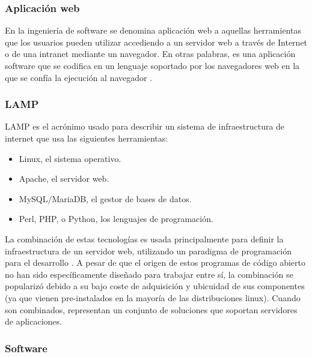 \subsubsection{Aplicación web}
En la ingeniería de software se denomina aplicación web a aquellas herramientas que los usuarios pueden utilizar accediendo a un servidor web a través de Internet o de una intranet mediante un navegador. En otras palabras, es una aplicación software que se codifica en un lenguaje soportado por los navegadores web en la que se confía la ejecución al navegador \citep{mora}.

\subsubsection{LAMP}

LAMP es el acrónimo usado para describir un sistema de infraestructura de internet que usa las siguientes herramientas:

\begin{itemize}
	\item Linux, el sistema operativo.
	\item Apache, el servidor web.
	\item MySQL/MariaDB, el gestor de bases de datos.
	\item Perl, PHP, o Python, los lenguajes de programación. 
\end{itemize}

La combinación de estas tecnologías es usada principalmente para definir la infraestructura de un servidor web, utilizando un paradigma de programación para el desarrollo \citep{apache}.
\vskip 0.3cm
A pesar de que el origen de estos programas de código abierto no han sido específicamente diseñado para trabajar entre sí, la combinación se popularizó debido a su bajo coste de adquisición y ubicuidad de sus componentes (ya que vienen pre-instalados en la mayoría de las distribuciones linux). Cuando son combinados, representan un conjunto de soluciones que soportan servidores de aplicaciones.

\subsubsection{Software}

